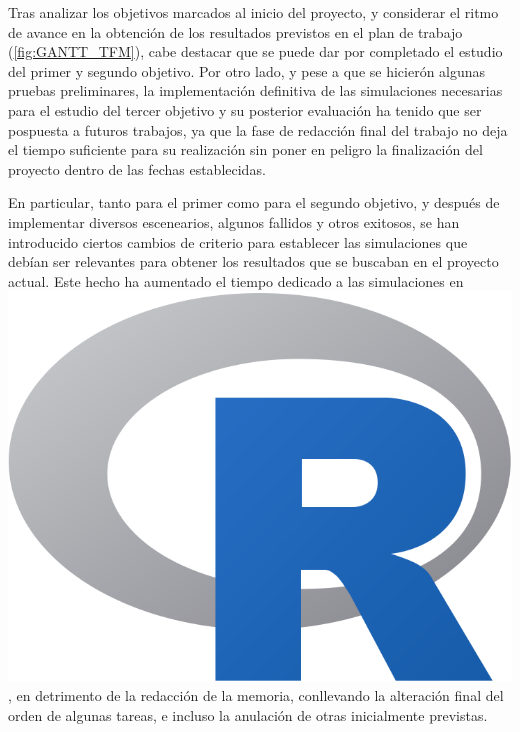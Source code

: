 \documentclass[IB,BIB]{TFUOC}%
\newcommand{\Rlogo}{\protect\includegraphics[height=2.5ex,keepaspectratio]{Rlogo.png}}
\begin{document}

Tras analizar los objetivos marcados al inicio del proyecto, y considerar el ritmo de avance en la obtención de los resultados previstos en el plan de trabajo (\ref{fig:GANTT_TFM}), cabe destacar que se puede dar por completado el estudio del primer y segundo objetivo. Por otro lado, y pese a que se hicierón algunas pruebas preliminares, la implementación definitiva de las simulaciones necesarias para el estudio del tercer objetivo y su posterior evaluación ha tenido que ser pospuesta a futuros trabajos, ya que la fase de redacción final del trabajo no deja el tiempo suficiente para su realización sin poner en peligro la finalización del proyecto dentro de las fechas establecidas. 

En particular, tanto para el primer como para el segundo objetivo, y después de implementar diversos escenearios, algunos fallidos y otros exitosos, se han introducido ciertos cambios de criterio para establecer las simulaciones que debían ser relevantes para obtener los resultados que se buscaban en el proyecto actual. Este hecho ha aumentado el tiempo dedicado a las simulaciones en \hspace{-.2em}\Rlogo\hspace{+.1em}, en detrimento de la redacción de la memoria, conllevando la alteración final del orden de algunas tareas, e incluso la anulación de otras inicialmente previstas.
\end{document}
